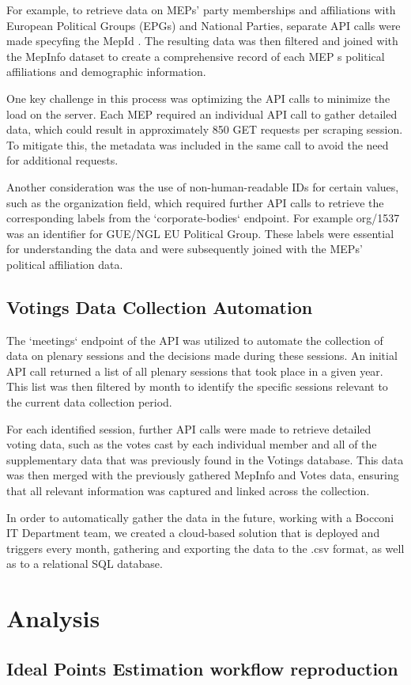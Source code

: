 \documentclass{article}
\begin{document}
For example, to retrieve data on MEPs' party memberships and affiliations with European Political Groups (EPGs) and National Parties, separate API calls were made specyfing the  MepId . The resulting data was then filtered and joined with the MepInfo dataset to create a comprehensive record of each MEP s political affiliations and demographic information.

One key challenge in this process was optimizing the API calls to minimize the load on the server. Each MEP required an individual API call to gather detailed data, which could result in approximately 850 GET requests per scraping session. To mitigate this, the metadata was included in the same call to avoid the need for additional requests.

Another consideration was the use of non-human-readable IDs for certain values, such as the  organization  field, which required further API calls to retrieve the corresponding labels from the `corporate-bodies` endpoint. For example  org/1537  was an identifier for  GUE/NGL  EU Political Group. These labels were essential for understanding the data and were subsequently joined with the MEPs' political affiliation data.

\subsection{Votings Data Collection Automation}

The `meetings` endpoint of the API was utilized to automate the collection of data on plenary sessions and the decisions made during these sessions. An initial API call returned a list of all plenary sessions that took place in a given year. This list was then filtered by month to identify the specific sessions relevant to the current data collection period.

For each identified session, further API calls were made to retrieve detailed voting data, such as the votes cast by each individual member and all of the supplementary data that was previously found in the Votings database. This data was then merged with the previously gathered MepInfo and Votes data, ensuring that all relevant information was captured and linked across the collection.

In order to automatically gather the data in the future, working with a Bocconi IT Department team, we created a cloud-based solution that is deployed and triggers every month, gathering and exporting the data to the  .csv  format, as well as to a relational SQL database.

\section{Analysis}
    \subsection{Ideal Points Estimation workflow reproduction}
    
\end{document}
